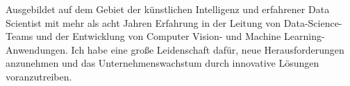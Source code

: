 %
%
%
\par{
    Ausgebildet auf dem Gebiet der künstlichen Intelligenz und erfahrener Data Scientist mit mehr als acht Jahren Erfahrung in der Leitung von Data-Science-Teams und der Entwicklung von Computer Vision- und Machine Learning-Anwendungen. Ich habe eine große Leidenschaft dafür, neue Herausforderungen anzunehmen und das Unternehmenswachstum durch innovative Lösungen voranzutreiben.
}
\vspace{6.6mm}